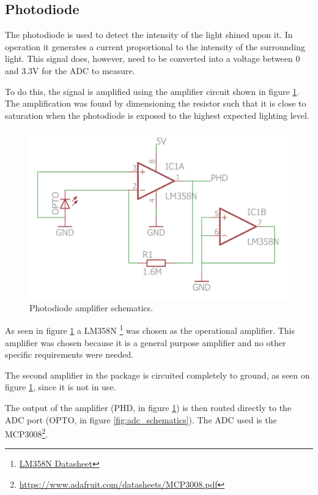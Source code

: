 

\subsection{Photodiode}
\label{sec:photodiode}


The photodiode is used to detect the intensity of the light shined upon it.
In operation it generates a current proportional to the intensity of the surrounding light.
This signal does, however, need to be converted into a voltage between 0 and 3.3V for the ADC to measure.

To do this, the signal is amplified using the amplifier circuit shown in figure \ref{fig:photodiodeschematics}.
The amplification was found by dimensioning the resistor such that it is close to saturation when the photodiode is exposed to the highest expected lighting level.


\begin{figure}[H]
\centering 
\includegraphics[width = 0.6 \textwidth]{images/optoamplifier_schematics}
\caption{Photodiode amplifier schematics.}
\label{fig:photodiodeschematics}
\end{figure}

As seen in figure \ref{fig:photodiodeschematics} a LM358N \footnote{\href{http://docs-europe.electrocomponents.com/webdocs/0780/0900766b807800ef.pdf}{LM358N Datasheet}} was chosen as the operational amplifier.
This amplifier was chosen because it is  a general purpose amplifier and no other specific requirements were needed.

The second amplifier in the package is circuited completely to ground, as seen on figure \ref{fig:photodiodeschematics}, since it is not in use.

The output of the amplifier (PHD, in figure \ref{fig:photodiodeschematics}) is then routed directly to the ADC port (OPTO, in figure \ref{fig:adc_schematics}).
The ADC used is the MCP3008\footnote{ \url{https://www.adafruit.com/datasheets/MCP3008.pdf} }.


